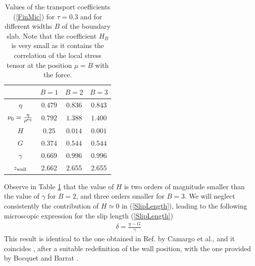 \documentclass[b5paper,openright,10pt]{book}
\begin{document}
\begin{table}[t]
  \centering
\begin{tabular}{|c|c|c|c|}
\hline
       & $B=1$                        & $B=2$ & $B=3$ \\
\hline
$\eta$  &  $0.479$   & $0.836$ & $0.843$ \\
$\nu_0=\frac{\eta}{\rho^{\rm eq}}$  &  $0.792$   & $1.388$ & $1.400$ \\
$H$  &  $0.25$   & $0.014$ & $0.001$\\
$G$  &  $0.374$   & $0.544$ & $0.544$\\
$\gamma$  &  $0.669$   & $0.996$ & $0.996$\\
$z_{\rm wall}$  &  2.662   & 2.655 & 2.655\\
\hline
\end{tabular}
\caption[Transport coefficients for different widths of the boundary slab]{Values of the transport coefficients (\ref{FinMic}) for $\tau=0.3$ and
  for  different  widths  $B$  of  the boundary  slab.   Note  that  the
  coefficient $H_B$ is very small as  it contains the correlation of the
  local stress tensor at the position $\mu=B$ with the force. }
\label{table}
\end{table}

Observe in  Table \ref{table} that the  value of $H$ is  two orders of
magnitude  smaller than  the value  of $\gamma$  for $B=2$,  and three
orders   smaller  for   $B=3$.  We   will  neglect   consistently  the
contribution  of  $H\simeq0$  in (\ref{SlipLength}),  leading  to  the
following microscopic expression for the slip length (\ref{SlipLength})
\begin{align}
 \delta=\frac{\eta-G}{\gamma}
\label{deltaBB}
\end{align}
  This result  is identical  to the  one
obtained in Ref.  \cite{CamargoBC2018} by Camargo et al., and it coincides , after a suitable redefinition of the wall position, with
the one provided by Bocquet and Barrat \cite{Bocquet1994}.
\end{document}
